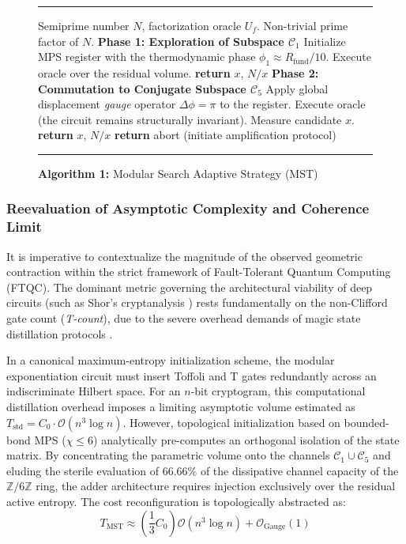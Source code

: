 \documentclass[reprint,aps,pra,superscriptaddress,nofootinbib]{revtex4-2}
\theoremstyle{plain}
\theoremstyle{definition}
\theoremstyle{remark}
\begin{document}
\begin{figure}[htbp]
\caption{\textbf{Algorithm 1:} Modular Search Adaptive Strategy (MST)}
\label{alg:estrategia}
\vspace{2mm}
\hrule
\vspace{2mm}
\begin{algorithmic}[1]
\Require Semiprime number $N$, factorization oracle $U_f$.
\Ensure Non-trivial prime factor of $N$.
\Statex
\State \textbf{Phase 1: Exploration of Subspace $\mathcal{C}_1$}
\State Initialize MPS register with the thermodynamic phase $\phi_1 \approx R_{\text{fund}}/10$.
\State Execute oracle over the residual volume.
    \State \textbf{return} $x$, $N/x$
\EndIf
\Statex
\State \textbf{Phase 2: Commutation to Conjugate Subspace $\mathcal{C}_5$}
\State Apply global displacement \textit{gauge} operator $\Delta\phi = \pi$ to the register.
\State Execute oracle (the circuit remains structurally invariant).
\State Measure candidate $x$.
    \State \textbf{return} $x$, $N/x$
\Else
    \State \textbf{return} abort (initiate amplification protocol)
\EndIf
\end{algorithmic}
\vspace{2mm}
\hrule
\end{figure}

\subsubsection*{Reevaluation of Asymptotic Complexity and Coherence Limit}

It is imperative to contextualize the magnitude of the observed geometric contraction within the strict framework of Fault-Tolerant Quantum Computing (FTQC). The dominant metric governing the architectural viability of deep circuits (such as Shor's cryptanalysis \cite{Shor1994}) rests fundamentally on the non-Clifford gate count (\textit{T-count}), due to the severe overhead demands of magic state distillation protocols \cite{Gidney2021}.

In a canonical maximum-entropy initialization scheme, the modular exponentiation circuit must insert Toffoli and T gates redundantly across an indiscriminate Hilbert space. For an $n$-bit cryptogram, this computational distillation overhead imposes a limiting asymptotic volume estimated as $T_{\text{std}} = C_0 \cdot \mathcal{O}(n^3 \log n)$. However, topological initialization based on bounded-bond MPS ($\chi \le 6$) analytically pre-computes an orthogonal isolation of the state matrix. By concentrating the parametric volume onto the channels $\mathcal{C}_1 \cup \mathcal{C}_5$ and eluding the sterile evaluation of $66.66\%$ of the dissipative channel capacity of the $\mathbb{Z}/6\mathbb{Z}$ ring, the adder architecture requires injection exclusively over the residual active entropy. The cost reconfiguration is topologically abstracted as:
\begin{equation}
T_{\text{MST}} \approx \left(\frac{1}{3} C_0 \right) \mathcal{O}(n^3 \log n) + \mathcal{O}_{\text{Gauge}}(1)
\label{eq:toffoli_reduction}
\end{equation}
\end{document}
